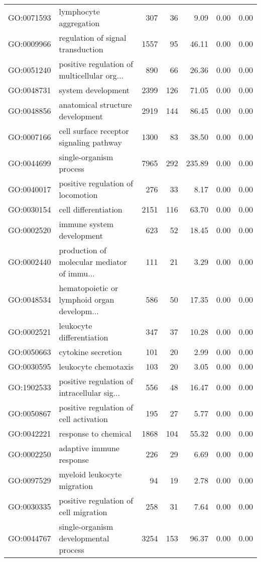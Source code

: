 \begin{table}[ht]
\begin{tabular}{llrrrrr}
  GO:0071593 & lymphocyte aggregation & 307 &  36 & 9.09 & 0.00 & 0.00 \\ 
  GO:0009966 & regulation of signal transduction & 1557 &  95 & 46.11 & 0.00 & 0.00 \\ 
  GO:0051240 & positive regulation of multicellular org... & 890 &  66 & 26.36 & 0.00 & 0.00 \\ 
  GO:0048731 & system development & 2399 & 126 & 71.05 & 0.00 & 0.00 \\ 
  GO:0048856 & anatomical structure development & 2919 & 144 & 86.45 & 0.00 & 0.00 \\ 
  GO:0007166 & cell surface receptor signaling pathway & 1300 &  83 & 38.50 & 0.00 & 0.00 \\ 
  GO:0044699 & single-organism process & 7965 & 292 & 235.89 & 0.00 & 0.00 \\ 
  GO:0040017 & positive regulation of locomotion & 276 &  33 & 8.17 & 0.00 & 0.00 \\ 
  GO:0030154 & cell differentiation & 2151 & 116 & 63.70 & 0.00 & 0.00 \\ 
  GO:0002520 & immune system development & 623 &  52 & 18.45 & 0.00 & 0.00 \\ 
  GO:0002440 & production of molecular mediator of immu... & 111 &  21 & 3.29 & 0.00 & 0.00 \\ 
  GO:0048534 & hematopoietic or lymphoid organ developm... & 586 &  50 & 17.35 & 0.00 & 0.00 \\ 
  GO:0002521 & leukocyte differentiation & 347 &  37 & 10.28 & 0.00 & 0.00 \\ 
  GO:0050663 & cytokine secretion & 101 &  20 & 2.99 & 0.00 & 0.00 \\ 
  GO:0030595 & leukocyte chemotaxis & 103 &  20 & 3.05 & 0.00 & 0.00 \\ 
  GO:1902533 & positive regulation of intracellular sig... & 556 &  48 & 16.47 & 0.00 & 0.00 \\ 
  GO:0050867 & positive regulation of cell activation & 195 &  27 & 5.77 & 0.00 & 0.00 \\ 
  GO:0042221 & response to chemical & 1868 & 104 & 55.32 & 0.00 & 0.00 \\ 
  GO:0002250 & adaptive immune response & 226 &  29 & 6.69 & 0.00 & 0.00 \\ 
  GO:0097529 & myeloid leukocyte migration &  94 &  19 & 2.78 & 0.00 & 0.00 \\ 
  GO:0030335 & positive regulation of cell migration & 258 &  31 & 7.64 & 0.00 & 0.00 \\ 
  GO:0044767 & single-organism developmental process & 3254 & 153 & 96.37 & 0.00 & 0.00 \\ 

\end{tabular}
\end{table}
